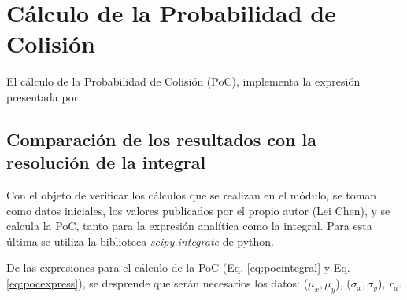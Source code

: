 % 

\section{C\'alculo de la Probabilidad de Colisi\'on}

El c\'alculo de la Probabilidad de Colisi\'on (PoC), implementa la expresi\'on presentada por  \cite[Lei Chen]{leichen}.


\subsection*{Comparaci\'on de los resultados con la resoluci\'on de la integral}
Con el objeto de verificar los c\'alculos que se realizan en el m\'odulo, se toman como datos iniciales, los valores publicados por el propio autor (Lei Chen), y se calcula la PoC, tanto para la expresi\'on anal\'itica como la integral. Para esta \'ultima se utiliza la biblioteca {\it{scipy.integrate}}  de python.

De las expresiones para el c\'alculo de la PoC (Eq. \ref{eq:pocintegral} y Eq. \ref{eq:pocexpress}), se desprende que ser\'an necesarios los datos: ($\mu_{x}, \mu_{y}$), ($\sigma_{x}, \sigma_{y}$), $r_{a}$.


